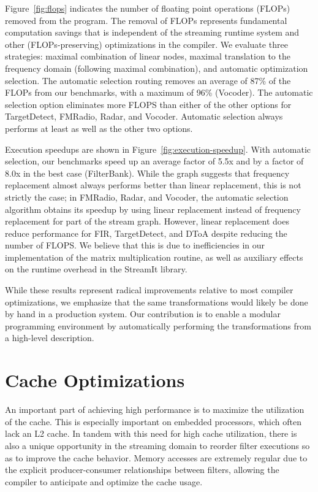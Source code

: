 Figure~\ref{fig:flops} indicates the number of floating point
operations (FLOPs) removed from the program.  The removal of FLOPs
represents fundamental computation savings that is independent of the
streaming runtime system and other (FLOPs-preserving) optimizations in
the compiler.  We evaluate three strategies: maximal combination of
linear nodes, maximal translation to the frequency domain (following
maximal combination), and automatic optimization selection.  The
automatic selection routing removes an average of 87\% of the FLOPs
from our benchmarks, with a maximum of 96\% (Vocoder).  The automatic
selection option eliminates more FLOPS than either of the other
options for TargetDetect, FMRadio, Radar, and Vocoder.  Automatic
selection always performs at least as well as the other two options.

Execution speedups are shown in Figure~\ref{fig:execution-speedup}.
With automatic selection, our benchmarks speed up an average factor of
5.5x and by a factor of 8.0x in the best case (FilterBank).  While the
graph suggests that frequency replacement almost always performs
better than linear replacement, this is not strictly the case; in
FMRadio, Radar, and Vocoder, the automatic selection algorithm obtains
its speedup by using linear replacement instead of frequency
replacement for part of the stream graph.  However, linear replacement
does reduce performance for FIR, TargetDetect, and DToA despite
reducing the number of FLOPS.  We believe that this is due to
inefficiencies in our implementation of the matrix multiplication
routine, as well as auxiliary effects on the runtime overhead in the
StreamIt library.

While these results represent radical improvements relative to most
compiler optimizations, we emphasize that the same transformations
would likely be done by hand in a production system.  Our contribution
is to enable a modular programming environment by automatically
performing the transformations from a high-level description.

\section{Cache Optimizations}

An important part of achieving high performance is to maximize the
utilization of the cache.  This is especially important on embedded
processors, which often lack an L2 cache.  In tandem with this need
for high cache utilization, there is also a unique opportunity in the
streaming domain to reorder filter executions so as to improve the
cache behavior.  Memory accesses are extremely regular due to the
explicit producer-consumer relationships between filters, allowing the
compiler to anticipate and optimize the cache usage.

